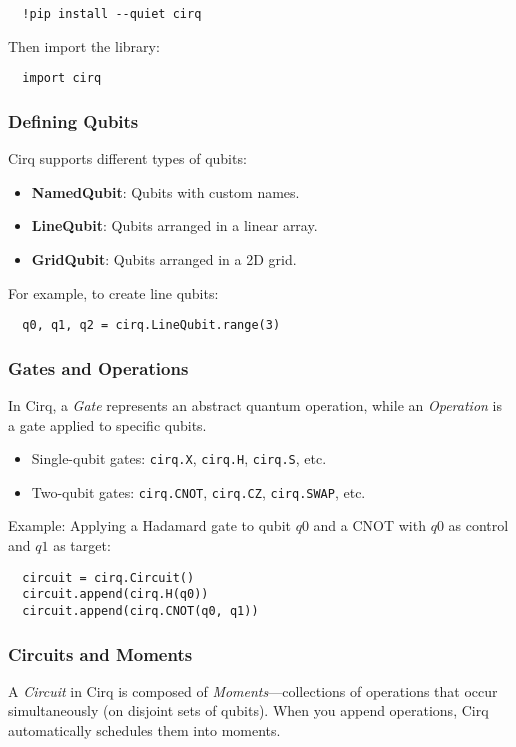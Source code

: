 \begin{verbatim}
  !pip install --quiet cirq
\end{verbatim}

Then import the library:

\begin{verbatim}
  import cirq
\end{verbatim}

\subsubsection*{Defining Qubits}
Cirq supports different types of qubits:
\begin{itemize}
  \item \textbf{NamedQubit}: Qubits with custom names.
  \item \textbf{LineQubit}: Qubits arranged in a linear array.
  \item \textbf{GridQubit}: Qubits arranged in a 2D grid.
\end{itemize}
For example, to create line qubits:
\begin{verbatim}
  q0, q1, q2 = cirq.LineQubit.range(3)
\end{verbatim}

\subsubsection*{Gates and Operations}
In Cirq, a \emph{Gate} represents an abstract quantum operation, while an
\emph{Operation} is a gate applied to specific qubits.

\begin{itemize}
  \item Single-qubit gates: \texttt{cirq.X}, \texttt{cirq.H},
    \texttt{cirq.S}, etc.
  \item Two-qubit gates: \texttt{cirq.CNOT}, \texttt{cirq.CZ},
    \texttt{cirq.SWAP}, etc.
\end{itemize}

Example: Applying a Hadamard gate to qubit \(q0\) and a CNOT with \(q0\) as
control and \(q1\) as target:

\begin{verbatim}
  circuit = cirq.Circuit()
  circuit.append(cirq.H(q0))
  circuit.append(cirq.CNOT(q0, q1))
\end{verbatim}

\subsubsection*{Circuits and Moments}
A \emph{Circuit} in Cirq is composed of \emph{Moments}—collections of
operations that occur simultaneously (on disjoint sets of qubits). When you
append operations, Cirq automatically schedules them into moments.

